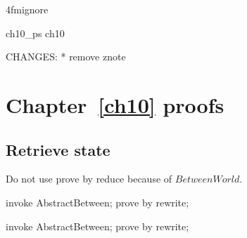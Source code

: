 \ai4fmignore{
\begin{zsection}
  \SECTION ch10\_ps \parents ch10
\end{zsection}
CHANGES:
* remove znote
}

\chapter{Chapter~\ref{ch10} proofs}

\section{Retrieve state}

Do not use prove by reduce because of $BetweenWorld$.
%
\begin{LDCheck}\begin{zproof}
    invoke AbstractBetween;
    prove by rewrite;
\end{zproof}\end{LDCheck}

\begin{LDCheck}\begin{zproof}
   invoke AbstractBetween;
   prove by rewrite;
\end{zproof}\end{LDCheck}

